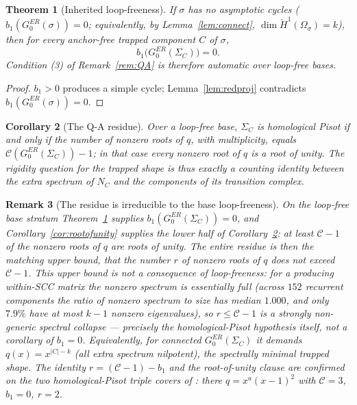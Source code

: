 \documentclass[11pt]{article}
\newtheorem{theorem}{Theorem}[section]
\newtheorem{corollary}[theorem]{Corollary}
\newtheorem{remark}[theorem]{Remark}
\begin{document}
\begin{theorem}[Inherited loop-freeness]\label{thm:inherit}
If $\sigma$ has no asymptotic cycles ($b_1(G_0^{ER}(\sigma))=0$;
equivalently, by Lemma~\ref{lem:connect}, $\dim\check
H^1(\Omega_\sigma)=k$), then for every anchor-free trapped component
$C$ of $\sigma$,
\[
b_1\bigl(G_0^{ER}(\Sigma_C)\bigr)=0 .
\]
Condition (3) of Remark~\ref{rem:QA} is therefore automatic over
loop-free bases.
\end{theorem}

\begin{proof}
$b_1>0$ produces a simple cycle; Lemma~\ref{lem:redproj} contradicts
$b_1(G_0^{ER}(\sigma))=0$.
\end{proof}

\begin{corollary}[The Q-A residue]\label{cor:QAresidue}
Over a loop-free base, $\Sigma_C$ is homological Pisot if and only if
the number of nonzero roots of $q$, with multiplicity, equals
$\mathcal C(G_0^{ER}(\Sigma_C))-1$; in that case every nonzero root of
$q$ is a root of unity. The rigidity question for the trapped shape is
thus exactly a counting identity between the extra spectrum of $N_C$
and the components of its transition complex.
\end{corollary}

\begin{remark}[The residue is irreducible to the base loop-freeness]
\label{rem:cond1-irreducible}
On the loop-free base stratum Theorem~\ref{thm:inherit} supplies
$b_1(G_0^{ER}(\Sigma_C))=0$, and Corollary~\ref{cor:rootofunity}
supplies the lower half of Corollary~\ref{cor:QAresidue}: at least
$\mathcal C-1$ of the nonzero roots of $q$ are roots of unity. The
entire residue is then the matching \emph{upper} bound, that the number
$r$ of nonzero roots of $q$ does not exceed $\mathcal C-1$. This upper
bound is not a consequence of loop-freeness: for a producing within-SCC
matrix the nonzero spectrum is essentially full (across $152$ recurrent
components the ratio of nonzero spectrum to size has median $1.000$,
and only $7.9\%$ have at most $k-1$ nonzero eigenvalues), so
$r\le\mathcal C-1$ is a strongly non-generic spectral collapse ---
precisely the homological-Pisot hypothesis itself, not a corollary of
$b_1=0$. Equivalently, for connected $G_0^{ER}(\Sigma_C)$ it demands
$q(x)=x^{|C|-k}$ (all extra spectrum nilpotent), the spectrally minimal
trapped shape. The identity $r=(\mathcal C-1)-b_1$ and the
root-of-unity clause are confirmed on the two homological-Pisot triple
covers of \cite{BBJS12}: there $q=x^{a}(x-1)^2$ with $\mathcal C=3$,
$b_1=0$, $r=2$.
\end{remark}
\end{document}
